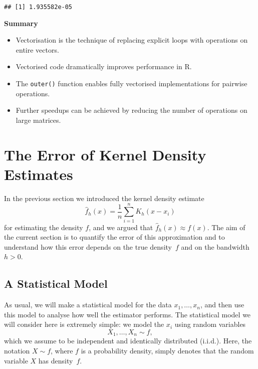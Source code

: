 \documentclass[
  a4paper,
]{article}
\providecommand{\tightlist}{%
  \setlength{\itemsep}{0pt}\setlength{\parskip}{0pt}}
\theoremstyle{definition}
\theoremstyle{definition}
\theoremstyle{definition}
\theoremstyle{definition}
\theoremstyle{remark}
\begin{document}
\begin{verbatim}
## [1] 1.935582e-05
\end{verbatim}

\textbf{Summary}

\begin{itemize}
\tightlist
\item
  Vectorisation is the technique of replacing explicit loops with operations on entire vectors.
\item
  Vectorised code dramatically improves performance in R.
\item
  The \texttt{outer()} function enables fully vectorised implementations for pairwise operations.
\item
  Further speedups can be achieved by reducing the number of operations on large matrices.
\end{itemize}

\clearpage

\section{The Error of Kernel Density Estimates}\label{X02-error}

In the previous section we introduced the kernel density estimate
\begin{equation}
  \hat f_h(x)
  = \frac{1}{n} \sum_{i=1}^n K_h(x - x_i)  \label{eq:KDE-est}
\end{equation}
for estimating the density \(f\), and we argued that \(\hat f_h(x) \approx f(x)\).
The aim of the current section is to quantify the error of this approximation
and to understand how this error depends on the true density~\(f\)
and on the bandwidth~\(h > 0\).

\subsection{A Statistical Model}\label{a-statistical-model}

As usual, we will make a statistical model for the data \(x_1, \ldots, x_n\),
and then use this model to analyse how well the estimator performs.
The statistical model we will consider here is extremely simple: we
model the \(x_i\) using random variables
\begin{equation}
  X_1, \ldots, X_n \sim f,  \label{eq:KDE-model}
\end{equation}
which we assume to be independent and identically distributed (i.i.d.).
Here, the notation \(X \sim f\), where \(f\) is a probability density, simply
denotes that the random variable \(X\) has density~\(f\).
\end{document}
